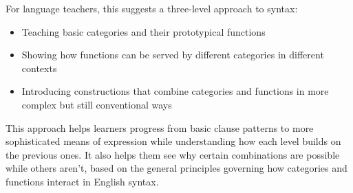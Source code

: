For language teachers, this suggests a three-level approach to syntax:
\begin{itemize}[noitemsep]
    \item Teaching basic categories and their prototypical functions
    \item Showing how functions can be served by different categories in different contexts
    \item Introducing constructions that combine categories and functions in more complex but still conventional ways
\end{itemize}

This approach helps learners progress from basic clause patterns to more sophisticated means of expression while understanding how each level builds on the previous ones. It also helps them see why certain combinations are possible while others aren't, based on the general principles governing how categories and functions interact in English syntax.